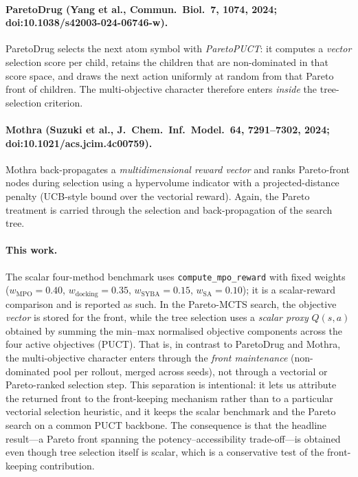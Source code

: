 \documentclass[10pt,a4paper]{article}
\begin{document}
\paragraph{ParetoDrug (Yang et al., Commun.\ Biol.\ 7, 1074, 2024;
doi:10.1038/s42003-024-06746-w).} ParetoDrug selects the next
atom symbol with \emph{ParetoPUCT}: it computes a \emph{vector} selection score
per child, retains the children that are non-dominated in that score space, and
draws the next action uniformly at random from that Pareto front of children.
The multi-objective character therefore enters \emph{inside} the tree-selection
criterion.

\paragraph{Mothra (Suzuki et al., J.~Chem.\ Inf.\ Model.\ 64, 7291--7302,
2024; doi:10.1021/acs.jcim.4c00759).} Mothra back-propagates a
\emph{multidimensional reward vector} and ranks Pareto-front nodes during
selection using a hypervolume indicator with a projected-distance penalty
(UCB-style bound over the vectorial reward). Again, the Pareto treatment is
carried through the selection and back-propagation of the search tree.

\paragraph{This work.} The scalar four-method benchmark uses
\texttt{compute\_mpo\_reward} with fixed weights ($w_{\text{MPO}}=\num{0.40}$,
$w_{\text{docking}}=\num{0.35}$, $w_{\text{SYBA}}=\num{0.15}$,
$w_{\text{SA}}=\num{0.10}$); it is a scalar-reward comparison and is reported
as such. In the Pareto-MCTS search, the objective \emph{vector} is stored for
the front, while the tree selection uses a \emph{scalar proxy}
$Q(s,a)$ obtained by summing the min--max normalised objective components
across the four active objectives (PUCT). That is, in contrast to ParetoDrug
and Mothra, the multi-objective character enters through the \emph{front
maintenance} (non-dominated pool per rollout, merged across seeds), not through
a vectorial or Pareto-ranked selection step. This separation is intentional: it
lets us attribute the returned front to the front-keeping mechanism rather than
to a particular vectorial selection heuristic, and it keeps the scalar benchmark
and the Pareto search on a common PUCT backbone. The consequence is that the
headline result---a Pareto front spanning the potency--accessibility
trade-off---is obtained even though tree selection itself is scalar, which is a
conservative test of the front-keeping contribution.
\end{document}
